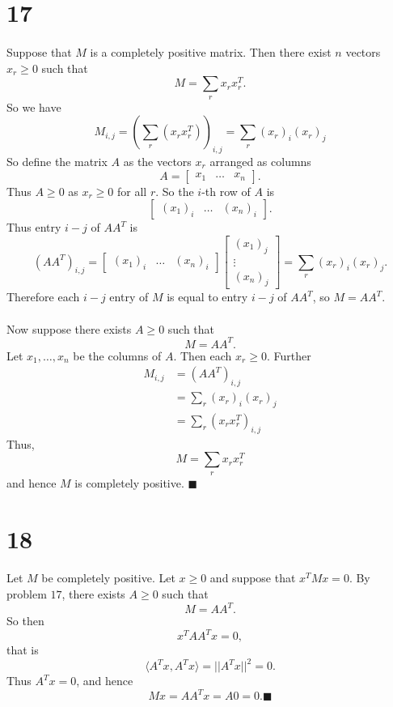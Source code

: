 \documentclass[letterpaper,12pt,oneside,onecolumn]{article}
\newcommand{\1}{\mathbbm{1}}
\begin{document}
\section*{17}
\paragraph{}
Suppose that $M$ is a completely positive matrix. Then there exist $n$ vectors $x_r \geq 0$ such that
$$M = \sum_r x_r x_r^T.$$
So we have
$$M_{i,j} = (\sum_r (x_rx_r^T))_{i,j} = \sum_r (x_r)_i(x_r)_j$$
So define the matrix $A$ as the vectors $x_r$ arranged as columns
$$A = \begin{bmatrix} x_1 & \dots & x_n\end{bmatrix}.$$
Thus $A \geq 0$ as $x_r \geq 0$ for all $r$. So the $i$-th row of $A$ is
$$\begin{bmatrix} (x_1)_i & \dots & (x_n)_i\end{bmatrix}.$$
Thus entry $i-j$ of $AA^T$ is 
$$(AA^T)_{i,j} = \begin{bmatrix} (x_1)_i & \dots & (x_n)_i\end{bmatrix}\begin{bmatrix} (x_1)_j \\\vdots \\ (x_n)_j \end{bmatrix} = \sum_r(x_r)_i(x_r)_j.$$
Therefore each $i-j$ entry of $M$ is equal to entry $i-j$ of $AA^T$, so $M = AA^T$. 
\paragraph{}
Now suppose there exists $A \geq 0$ such that $$M = AA^T.$$
Let $x_1, \dots, x_n$ be the columns of $A$.  Then each $x_r \geq 0$. Further
\begin{align*}
M_{i,j} &= (AA^T)_{i,j} \\
&=  \sum_r (x_r)_i (x_r)_j \\
&= \sum_r(x_r x_r^T)_{i,j} 
\end{align*}
Thus,
$$M = \sum_r x_r x_r^T$$
and hence $M$ is completely positive. $\blacksquare$
\section*{18}
\paragraph{}
Let $M$ be completely positive. Let $x \geq 0$ and suppose that $x^TMx = 0$. By problem $17$, there exists $A \geq 0$ such that
$$ M = AA^T.$$
So then 
$$x^TAA^Tx = 0,$$
that is
$$\langle A^Tx, A^Tx \rangle = ||A^Tx||^2 = 0.$$
Thus $A^Tx = 0$, and hence
$$Mx = AA^Tx = A0 = 0.\blacksquare$$
\end{document}
